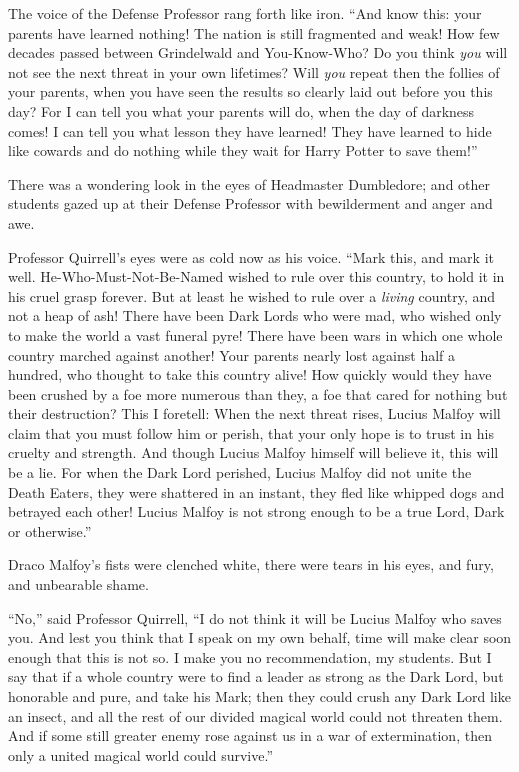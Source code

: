 The voice of the Defense Professor rang forth like iron. ``And know this: your parents have learned nothing! The nation is still fragmented and weak! How few decades passed between Grindelwald and You-Know-Who? Do you think \emph{you} will not see the next threat in your own lifetimes? Will \emph{you} repeat then the follies of your parents, when you have seen the results so clearly laid out before you this day? For I can tell you what your parents will do, when the day of darkness comes! I can tell you what lesson they have learned! They have learned to hide like cowards and do nothing while they wait for Harry Potter to save them!''

There was a wondering look in the eyes of Headmaster Dumbledore; and other students gazed up at their Defense Professor with bewilderment and anger and awe.

Professor Quirrell's eyes were as cold now as his voice. ``Mark this, and mark it well. He-Who-Must-Not-Be-Named wished to rule over this country, to hold it in his cruel grasp forever. But at least he wished to rule over a \emph{living} country, and not a heap of ash! There have been Dark Lords who were mad, who wished only to make the world a vast funeral pyre! There have been wars in which one whole country marched against another! Your parents nearly lost against half a hundred, who thought to take this country alive! How quickly would they have been crushed by a foe more numerous than they, a foe that cared for nothing but their destruction? This I foretell: When the next threat rises, Lucius Malfoy will claim that you must follow him or perish, that your only hope is to trust in his cruelty and strength. And though Lucius Malfoy himself will believe it, this will be a lie. For when the Dark Lord perished, Lucius Malfoy did not unite the Death Eaters, they were shattered in an instant, they fled like whipped dogs and betrayed each other! Lucius Malfoy is not strong enough to be a true Lord, Dark or otherwise.''

Draco Malfoy's fists were clenched white, there were tears in his eyes, and fury, and unbearable shame.

``No,'' said Professor Quirrell, ``I do not think it will be Lucius Malfoy who saves you. And lest you think that I speak on my own behalf, time will make clear soon enough that this is not so. I make you no recommendation, my students. But I say that if a whole country were to find a leader as strong as the Dark Lord, but honorable and pure, and take his Mark; then they could crush any Dark Lord like an insect, and all the rest of our divided magical world could not threaten them. And if some still greater enemy rose against us in a war of extermination, then only a united magical world could survive.''

